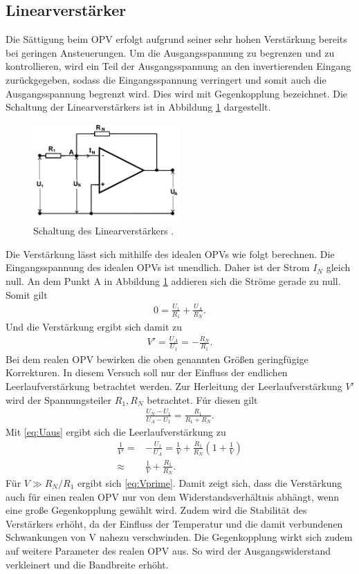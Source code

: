  \subsection{Linearverstärker}
 Die Sättigung beim OPV erfolgt aufgrund seiner sehr hohen Verstärkung bereits bei geringen Ansteuerungen. 
 Um die Ausgangsspannung 
 zu begrenzen und zu kontrollieren,
wird ein Teil der Ausgangsspannung an den invertierenden Eingang zurückgegeben, sodass
die Eingangsspannung verringert und somit
auch die Ausgangsspannung begrenzt wird.
Dies wird mit Gegenkopplung bezeichnet. Die
Schaltung der Linearverstärkers ist in Abbildung \ref{pic:linear}
dargestellt. 
\begin{figure}[t]
 \includegraphics[width = 0.5\textwidth]{../pics/Linear.png}
 \caption{Schaltung des Linearverstärkers \cite{Anl}.}
 \label{pic:linear}
\end{figure}
Die Verstärkung lässt sich mithilfe
des idealen OPVs wie folgt berechnen. Die Eingangsspannung des idealen OPVs ist
unendlich. Daher ist der Strom $I_N$ gleich null. An dem Punkt A in Abbildung \ref{pic:linear}
addieren sich die Ströme gerade zu null. Somit gilt
\begin{align}
 0 = \frac{U_1}{R_1} + \frac{U_A}{R_N}.
\end{align}
Und die Verstärkung ergibt sich damit zu
\begin{align}
 V' = \frac{U_A}{U_1} = -\frac{R_N}{R_1}.
 \label{eq:Vprime}
\end{align}
Bei dem realen OPV bewirken die oben genannten Größen geringfügige Korrekturen.
In diesem Versuch soll nur der Einfluss der endlichen Leerlaufverstärkung betrachtet werden.
Zur Herleitung der Leerlaufverstärkung $V'$ wird der Spannungsteiler $R_1,R_N$ betrachtet.
Für diesen gilt
\begin{align}
 \frac{U_N-U_1}{U_A-U_1} = \frac{R_1}{R_1+R_N}.
\end{align}
Mit \eqref{eq:Uaus} ergibt sich die Leerlaufverstärkung zu
\begin{align}
 \frac{1}{V'} =& -\frac{U_1}{U_A} = \frac{1}{V} + \frac{R_1}{R_N}\left(1+\frac{1}{V}\right) \\
 \approx& \frac{1}{V} + \frac{R_1}{R_N}.
\end{align}
Für $V\gg R_N/R_1$ ergibt sich \eqref{eq:Vprime}. 
Damit zeigt sich, dass die Verstärkung 
auch für einen realen OPV nur von
dem Widerstandsverhältnis abhängt, wenn eine 
große Gegenkopplung gewählt wird. Zudem 
wird die Stabilität des Verstärkers erhöht,
da der Einfluss der Temperatur und die damit 
verbundenen Schwankungen von V nahezu
verschwinden. Die Gegenkopplung wirkt sich
zudem auf weitere Parameter des realen OPV
aus. So wird der Ausgangswiderstand verkleinert 
und die Bandbreite erhöht.

